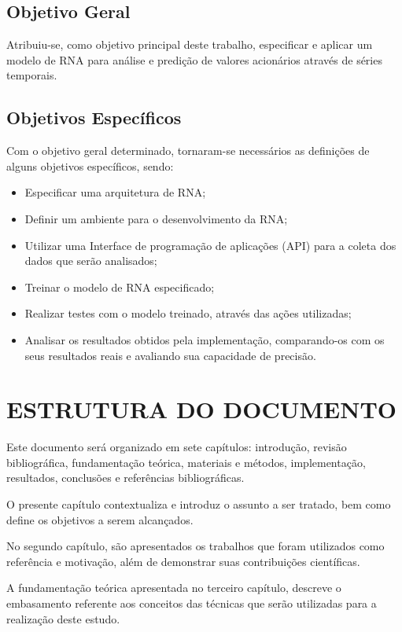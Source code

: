 \subsection{Objetivo Geral} 
Atribuiu-se, como objetivo principal deste trabalho, especificar e aplicar um modelo de RNA para análise e predição de valores acionários através de séries temporais.

\subsection{Objetivos Específicos}\label{subsec:objetivos_especificos}
Com o objetivo geral determinado, tornaram-se necessários as definições de alguns objetivos específicos, sendo:
\begin{itemize}
	\item Especificar uma arquitetura de RNA;
	\item Definir um ambiente para o desenvolvimento da RNA;
	\item Utilizar uma Interface de programação de aplicações (API) para a coleta dos dados que serão analisados;
	\item Treinar o modelo de RNA especificado;
	\item Realizar testes com o modelo treinado, através das ações utilizadas;
	\item Analisar os resultados obtidos pela implementação, comparando-os com os seus resultados reais e avaliando sua capacidade de precisão.
\end{itemize}

\section{ESTRUTURA DO DOCUMENTO}\label{sec:organizacao-trabalho}
Este documento será organizado em sete capítulos: introdução, revisão bibliográfica, fundamentação teórica, materiais e métodos, implementação, resultados, conclusões e referências bibliográficas.

O presente capítulo contextualiza e introduz o assunto a ser tratado, bem como define os objetivos a serem alcançados.

No segundo capítulo, são apresentados os trabalhos que foram utilizados como referência e motivação, além de demonstrar suas contribuições científicas.

A fundamentação teórica apresentada no terceiro capítulo, descreve o embasamento referente aos conceitos das técnicas que serão utilizadas para a realização deste estudo.

